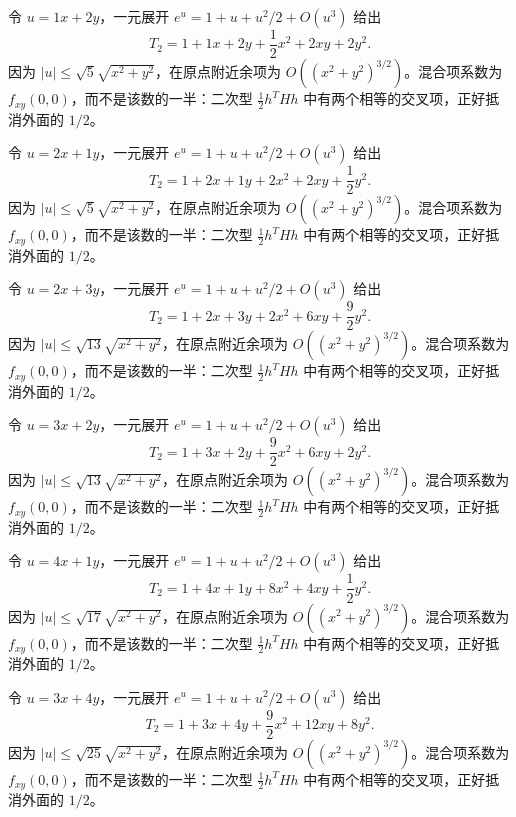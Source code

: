 \documentclass[12pt,fontset=fandol]{ctexart}
\begin{document}
\begin{solve}\label{ans:c33q19}
令 $u=1x+2y$，一元展开 $e^u=1+u+u^2/2+O(u^3)$ 给出
\[
T_2=1+1x+2y+\frac{1}{2}x^2+2xy+2y^2.
\]
因为 $|u|\le\sqrt{5}\sqrt{x^2+y^2}$，在原点附近余项为 $O((x^2+y^2)^{3/2})$。混合项系数为 $f_{xy}(0,0)$，而不是该数的一半：二次型 $\frac12h^THh$ 中有两个相等的交叉项，正好抵消外面的 $1/2$。
\end{solve}

\begin{solve}\label{ans:c33q20}
令 $u=2x+1y$，一元展开 $e^u=1+u+u^2/2+O(u^3)$ 给出
\[
T_2=1+2x+1y+2x^2+2xy+\frac{1}{2}y^2.
\]
因为 $|u|\le\sqrt{5}\sqrt{x^2+y^2}$，在原点附近余项为 $O((x^2+y^2)^{3/2})$。混合项系数为 $f_{xy}(0,0)$，而不是该数的一半：二次型 $\frac12h^THh$ 中有两个相等的交叉项，正好抵消外面的 $1/2$。
\end{solve}

\begin{solve}\label{ans:c33q21}
令 $u=2x+3y$，一元展开 $e^u=1+u+u^2/2+O(u^3)$ 给出
\[
T_2=1+2x+3y+2x^2+6xy+\frac{9}{2}y^2.
\]
因为 $|u|\le\sqrt{13}\sqrt{x^2+y^2}$，在原点附近余项为 $O((x^2+y^2)^{3/2})$。混合项系数为 $f_{xy}(0,0)$，而不是该数的一半：二次型 $\frac12h^THh$ 中有两个相等的交叉项，正好抵消外面的 $1/2$。
\end{solve}

\begin{solve}\label{ans:c33q22}
令 $u=3x+2y$，一元展开 $e^u=1+u+u^2/2+O(u^3)$ 给出
\[
T_2=1+3x+2y+\frac{9}{2}x^2+6xy+2y^2.
\]
因为 $|u|\le\sqrt{13}\sqrt{x^2+y^2}$，在原点附近余项为 $O((x^2+y^2)^{3/2})$。混合项系数为 $f_{xy}(0,0)$，而不是该数的一半：二次型 $\frac12h^THh$ 中有两个相等的交叉项，正好抵消外面的 $1/2$。
\end{solve}

\begin{solve}\label{ans:c33q23}
令 $u=4x+1y$，一元展开 $e^u=1+u+u^2/2+O(u^3)$ 给出
\[
T_2=1+4x+1y+8x^2+4xy+\frac{1}{2}y^2.
\]
因为 $|u|\le\sqrt{17}\sqrt{x^2+y^2}$，在原点附近余项为 $O((x^2+y^2)^{3/2})$。混合项系数为 $f_{xy}(0,0)$，而不是该数的一半：二次型 $\frac12h^THh$ 中有两个相等的交叉项，正好抵消外面的 $1/2$。
\end{solve}

\begin{solve}\label{ans:c33q24}
令 $u=3x+4y$，一元展开 $e^u=1+u+u^2/2+O(u^3)$ 给出
\[
T_2=1+3x+4y+\frac{9}{2}x^2+12xy+8y^2.
\]
因为 $|u|\le\sqrt{25}\sqrt{x^2+y^2}$，在原点附近余项为 $O((x^2+y^2)^{3/2})$。混合项系数为 $f_{xy}(0,0)$，而不是该数的一半：二次型 $\frac12h^THh$ 中有两个相等的交叉项，正好抵消外面的 $1/2$。
\end{solve}
\end{document}
